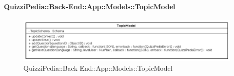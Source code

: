 \paragraph{QuizziPedia::Back-End::App::Models::TopicModel}
\label{QuizziPedia::Back-End::App::Models::TopicModel}
\begin{figure}[ht]
	\centering
	\includegraphics[scale=0.45]{UML/Classi/Back-End/QuizziPedia_Back-End_App_Models_topicModel.png}
	\caption{QuizziPedia::Back-End::App::Models::TopicModel}
\end{figure}
\FloatBarrier
